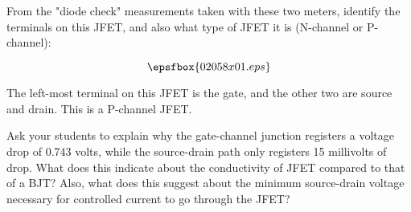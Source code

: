 

From the "diode check" measurements taken with these two meters, identify the terminals on this JFET, and also what type of JFET it is (N-channel or P-channel):

$$\epsfbox{02058x01.eps}$$







The left-most terminal on this JFET is the gate, and the other two are source and drain.  This is a P-channel JFET.







Ask your students to explain why the gate-channel junction registers a voltage drop of 0.743 volts, while the source-drain path only registers 15 millivolts of drop.  What does this indicate about the conductivity of  JFET compared to that of a BJT?  Also, what does this suggest about the minimum source-drain voltage necessary for controlled current to go through the JFET?




